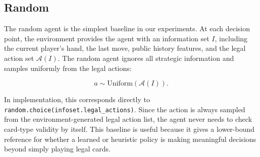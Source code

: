 
\subsection{Random}

The random agent is the simplest baseline in our experiments. At each decision
point, the environment provides the agent with an information set \(I\),
including the current player's hand, the last move, public history features, and
the legal action set \(\mathcal{A}(I)\). The random agent ignores all strategic
information and samples uniformly from the legal actions:

\[
    a \sim \mathrm{Uniform}(\mathcal{A}(I)).
\]

In implementation, this corresponds directly to
\texttt{random.choice(infoset.legal\_actions)}. Since the action is always
sampled from the environment-generated legal action list, the agent never needs
to check card-type validity by itself. This baseline is useful because it gives
a lower-bound reference for whether a learned or heuristic policy is making
meaningful decisions beyond simply playing legal cards.